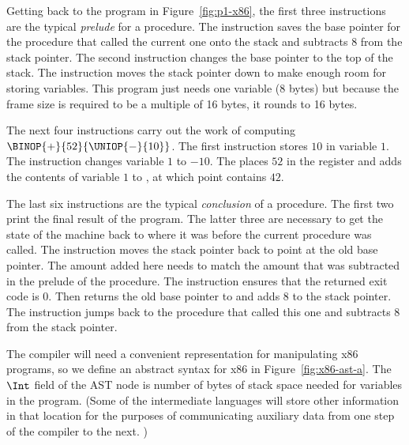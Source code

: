 \documentclass[11pt]{book}
\begin{document}
Getting back to the program in Figure~\ref{fig:p1-x86}, the first
three instructions are the typical \emph{prelude} for a procedure.
The instruction  saves the base pointer for the
procedure that called the current one onto the stack and subtracts $8$
from the stack pointer. The second instruction 
changes the base pointer to the top of the stack. The instruction
 moves the stack pointer down to make enough
room for storing variables.  This program just needs one variable ($8$
bytes) but because the frame size is required to be a multiple of 16
bytes, it rounds to 16 bytes.

The next four instructions carry out the work of computing
$\BINOP{+}{52}{\UNIOP{-}{10} }$. The first instruction  stores $10$ in variable $1$. The instruction  changes variable $1$ to $-10$. The 
places $52$ in the register  and 
adds the contents of variable $1$ to , at which point
 contains $42$.

The last six instructions are the typical \emph{conclusion} of a
procedure. The first two print the final result of the program. The
latter three are necessary to get the state of the machine back to
where it was before the current procedure was called.  The  instruction moves the stack pointer back to point at
the old base pointer. The amount added here needs to match the amount
that was subtracted in the prelude of the procedure. The  instruction ensures that the returned exit code is 0.
Then  returns the old base pointer to  and
adds $8$ to the stack pointer.  The  instruction jumps back
to the procedure that called this one and subtracts 8 from the stack
pointer.

The compiler will need a convenient representation for manipulating
x86 programs, so we define an abstract syntax for x86 in
Figure~\ref{fig:x86-ast-a}. The $\Int$ field of the  AST
node is number of bytes of stack space needed for variables in the
program. (Some of the intermediate languages will store other
information in that location for the purposes of communicating
auxiliary data from one step of the compiler to the next. )
\end{document}
